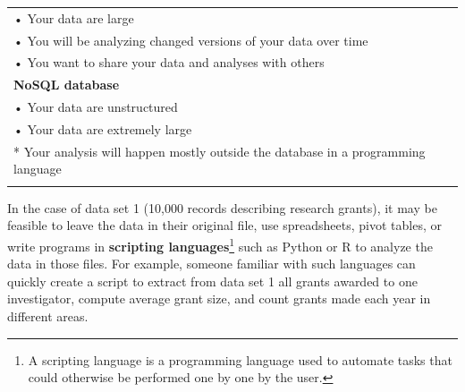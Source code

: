 \documentclass[]{krantz}
\begin{document}
\begin{longtable}[]{@{}l@{}}
\begin{minipage}[t]{0.89\columnwidth}\raggedright\strut
• Your data are large\strut
\end{minipage}\tabularnewline
\begin{minipage}[t]{0.89\columnwidth}\raggedright\strut
• You will be analyzing changed versions of your data over time\strut
\end{minipage}\tabularnewline
\begin{minipage}[t]{0.89\columnwidth}\raggedright\strut
• You want to share your data and analyses with others\strut
\end{minipage}\tabularnewline
\begin{minipage}[t]{0.89\columnwidth}\raggedright\strut
\textbf{NoSQL database}\strut
\end{minipage}\tabularnewline
\begin{minipage}[t]{0.89\columnwidth}\raggedright\strut
• Your data are unstructured\strut
\end{minipage}\tabularnewline
\begin{minipage}[t]{0.89\columnwidth}\raggedright\strut
• Your data are extremely large\strut
\end{minipage}\tabularnewline
\begin{minipage}[t]{0.89\columnwidth}\raggedright\strut
* Your analysis will happen mostly outside the database in a programming
language\strut
\end{minipage}\tabularnewline
\begin{minipage}[t]{0.89\columnwidth}\raggedright\strut
\strut
\end{minipage}\tabularnewline
\bottomrule
\end{longtable}

In the case of data set 1 (10,000 records describing research grants),
it may be feasible to leave the data in their original file, use
spreadsheets, pivot tables, or write programs in \textbf{scripting
languages}\footnote{A scripting language is a programming language used
  to automate tasks that could otherwise be performed one by one by the
  user.} such as Python or R to analyze the data in those files. For
example, someone familiar with such languages can quickly create a
script to extract from data set 1 all grants awarded to one
investigator, compute average grant size, and count grants made each
year in different areas.
\end{document}
